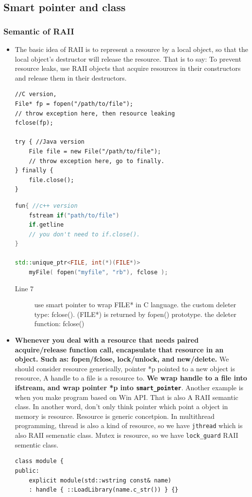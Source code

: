 \documentclass[a4paper,11pt,twoside]{book}
\begin{document}
\subsection{Smart pointer and class}
\subsubsection{Semantic of RAII}

\begin{itemize}
		\item The basic idea of RAII is to represent a resource by a local object, so that the local object's destructor will release the resource.  That is to say: To prevent resource leaks, use RAII objects that acquire resources in their constructors and release them in their destructors.
\begin{lstlisting}[numbers = none]
//C version,
File* fp = fopen("/path/to/file");
// throw exception here, then resource leaking
fclose(fp);
	
try { //Java version
	File file = new File("/path/to/file");
	// throw exception here, go to finally.
} finally {
	file.close();
}
\end{lstlisting}
	
\begin{lstlisting}[frame=single, language=c++]
fun{ //c++ version
	fstream if("path/to/file")
	if.getline
	// you don't need to if.close().
}
	
std::unique_ptr<FILE, int(*)(FILE*)> 
	myFile( fopen("myfile", "rb"), fclose );              
\end{lstlisting}

\begin{description}
	\item[Line 7] use smart pointer to wrap FILE* in C language. the custom deleter type: fclose(). (FILE*) is returned by fopen() prototype. the deleter function: fclose() 
\end{description}
			
	\item \textbf{Whenever you deal with a resource that needs paired acquire/release function call, encapsulate that resource in an object.  Such as: fopen/fclose, lock/unlock, and new/delete.} We should consider resource generically, pointer *p pointed to a new object is resource, A handle to a file is a resource to. \textbf{We wrap handle to a file into ifstream, and wrap pointer *p into \texttt{smart\_pointer}}.  Another example is when you make program based on Win API. That is also A RAII semantic class. In another word, don't only think pointer which point a object in memory is resource. Resource is generic concetpion. In multithread programming, thread is also a kind of resource, so we have \texttt{jthread} which is also RAII semenatic class. Mutex is resource, so we have \texttt{lock\_guard} RAII sementic class. 
\begin{lstlisting}[numbers=none]
class module {
public:
	explicit module(std::wstring const& name)
	: handle { ::LoadLibrary(name.c_str()) } {}
	

\end{lstlisting}
\end{itemize}
\end{document}

